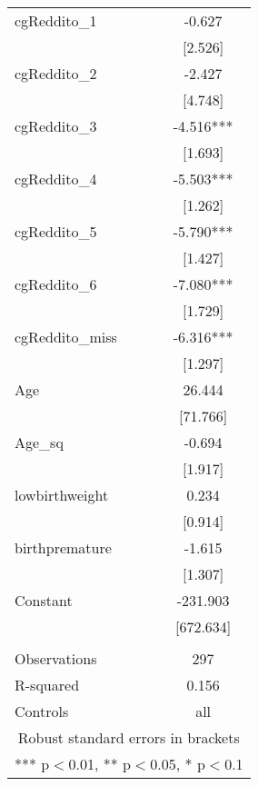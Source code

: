 \documentclass[]{article}
\begin{document}
\begin{tabular}{lc}
cgReddito\_1 & -0.627 \\
 & [2.526] \\
cgReddito\_2 & -2.427 \\
 & [4.748] \\
cgReddito\_3 & -4.516*** \\
 & [1.693] \\
cgReddito\_4 & -5.503*** \\
 & [1.262] \\
cgReddito\_5 & -5.790*** \\
 & [1.427] \\
cgReddito\_6 & -7.080*** \\
 & [1.729] \\
cgReddito\_miss & -6.316*** \\
 & [1.297] \\
Age & 26.444 \\
 & [71.766] \\
Age\_sq & -0.694 \\
 & [1.917] \\
lowbirthweight & 0.234 \\
 & [0.914] \\
birthpremature & -1.615 \\
 & [1.307] \\
Constant & -231.903 \\
 & [672.634] \\
 &  \\
Observations & 297 \\
R-squared & 0.156 \\
 Controls & all \\ \hline
\multicolumn{2}{c}{ Robust standard errors in brackets} \\
\multicolumn{2}{c}{ *** p$<$0.01, ** p$<$0.05, * p$<$0.1} \\
\end{tabular}
\end{document}
